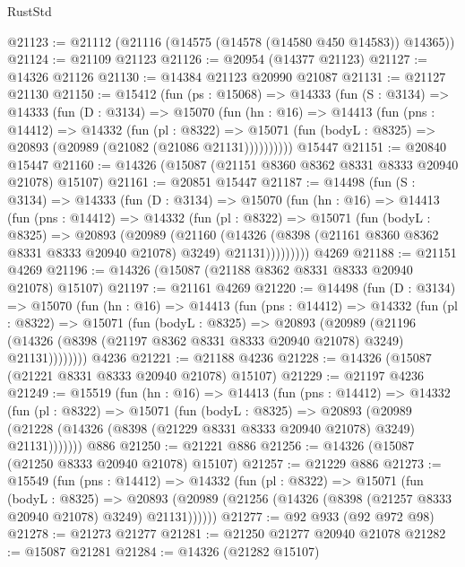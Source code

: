 \begin{lexlean}{RustStd}
\begin{coremodule}
@21123 := @21112 (@21116 (@14575 (@14578 (@14580 @450 @14583)) @14365))
@21124 := @21109 @21123
@21126 := @20954 (@14377 @21123)
@21127 := @14326 @21126
@21130 := @14384 @21123 @20990 @21087
@21131 := @21127 @21130
@21150 := @15412
    (fun (ps : @15068) =>
    @14333
      (fun (S : @3134) =>
      @14333
        (fun (D : @3134) =>
        @15070
          (fun (hn : @16) =>
          @14413
            (fun (pns : @14412) =>
            @14332
              (fun (pl : @8322) =>
              @15071 (fun (bodyL : @8325) => @20893 (@20989 (@21082 (@21086 @21131))))))))))
    @15447
@21151 := @20840 @15447
@21160 := @14326 (@15087 (@21151 @8360 @8362 @8331 @8333 @20940 @21078) @15107)
@21161 := @20851 @15447
@21187 := @14498
    (fun (S : @3134) =>
    @14333
      (fun (D : @3134) =>
      @15070
        (fun (hn : @16) =>
        @14413
          (fun (pns : @14412) =>
          @14332
            (fun (pl : @8322) =>
            @15071
              (fun (bodyL : @8325) =>
              @20893
                (@20989
                  (@21160
                    (@14326
                      (@8398 (@21161 @8360 @8362 @8331 @8333 @20940 @21078) @3249)
                      @21131)))))))))
    @4269
@21188 := @21151 @4269
@21196 := @14326 (@15087 (@21188 @8362 @8331 @8333 @20940 @21078) @15107)
@21197 := @21161 @4269
@21220 := @14498
    (fun (D : @3134) =>
    @15070
      (fun (hn : @16) =>
      @14413
        (fun (pns : @14412) =>
        @14332
          (fun (pl : @8322) =>
          @15071
            (fun (bodyL : @8325) =>
            @20893
              (@20989
                (@21196
                  (@14326 (@8398 (@21197 @8362 @8331 @8333 @20940 @21078) @3249) @21131))))))))
    @4236
@21221 := @21188 @4236
@21228 := @14326 (@15087 (@21221 @8331 @8333 @20940 @21078) @15107)
@21229 := @21197 @4236
@21249 := @15519
    (fun (hn : @16) =>
    @14413
      (fun (pns : @14412) =>
      @14332
        (fun (pl : @8322) =>
        @15071
          (fun (bodyL : @8325) =>
          @20893
            (@20989 (@21228 (@14326 (@8398 (@21229 @8331 @8333 @20940 @21078) @3249) @21131)))))))
    @886
@21250 := @21221 @886
@21256 := @14326 (@15087 (@21250 @8333 @20940 @21078) @15107)
@21257 := @21229 @886
@21273 := @15549
    (fun (pns : @14412) =>
    @14332
      (fun (pl : @8322) =>
      @15071
        (fun (bodyL : @8325) =>
        @20893 (@20989 (@21256 (@14326 (@8398 (@21257 @8333 @20940 @21078) @3249) @21131))))))
@21277 := @92 @933 (@92 @972 @98)
@21278 := @21273 @21277
@21281 := @21250 @21277 @20940 @21078
@21282 := @15087 @21281
@21284 := @14326 (@21282 @15107)

\end{coremodule}
\end{lexlean}
